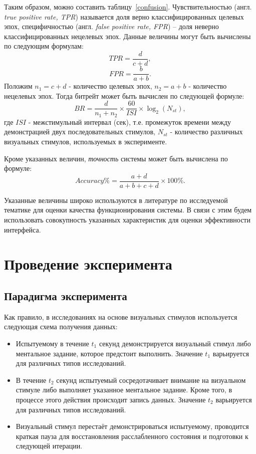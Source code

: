 \documentclass[12pt,a4paper,oneside,fleqn,leqno]{article}
\begin{document}
	Таким образом, можно составить таблицу~\ref{confusion}. Чувствительностью (англ. {\it true positive rate, TPR}) называется доля верно классифицированных целевых эпох, специфичностью (англ. {\it false positive rate, FPR}) -- доля неверно классифицированных нецелевых эпох. Данные величины могут быть вычислены по следующим формулам:
$$TPR = \frac{d}{c+d},$$
$$FPR = \frac{b}{a+b}.$$
	Положим $n_1 = c+d$ - количество целевых эпох, $n_2 = a+b$ - количество нецелевых эпох. Тогда битрейт может быть вычислен по следующей формуле:
$$BR = \frac{d}{n_1 + n_2} \times \frac{60}{ISI} \times \log_2 (N_{st}),$$
где $ISI$ - межстимульный интервал (сек), т.е. промежуток времени между демонстрацией двух последовательных стимулов, $N_{st}$ - количество различных визуальных стимулов, используемых в эксперименте.
	\par Кроме указанных величин, {\it точность} системы может быть вычислена по формуле:
	$$Accuracy \% = \frac{a+d}{a+b+c+d} \times 100 \%.$$
	\par Указанные величины широко используются в литературе по исследуемой тематике для оценки качества функционирования системы. В связи с этим будем использовать совокупность указанных характеристик для оценки эффективности интерфейса.
\newpage

\section{Проведение эксперимента}
\subsection{Парадигма эксперимента}
	\par Как правило, в исследованиях на основе визуальных стимулов используется следующая схема получения данных:
	\begin{itemize}
	\item
	Испытуемому в течение $t_1$ секунд демонстрируется визуальный стимул либо ментальное задание, которое предстоит выполнить. Значение $t_1$ варьируется для различных типов исследований.
	\item
	В течение $t_2$ секунд испытуемый сосредотачивает внимание на визуальном стимуле либо выполняет указанное ментальное задание. Кроме того, в процессе этого действия происходит запись данных. Значение $t_2$ варьируется для различных типов исследований.
	\item
	Визуальный стимул перестаёт демонстрироваться испытуемому, проводится краткая пауза для восстановления расслабленного состояния и подготовки к следующей итерации.
	\end{itemize}
\end{document}
